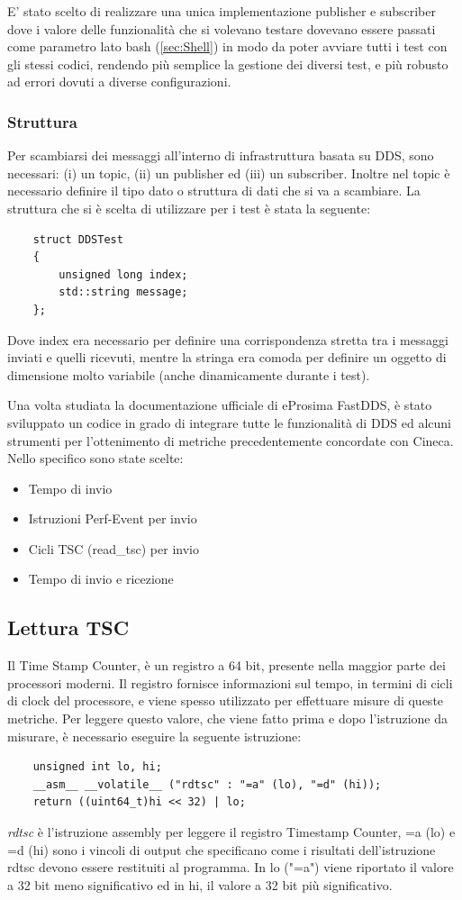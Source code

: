 E' stato scelto di realizzare una unica implementazione publisher e subscriber dove i valore delle funzionalità che si volevano testare dovevano essere passati come parametro lato bash (\ref{sec:Shell}) in modo da poter avviare tutti i test con gli stessi codici, rendendo più semplice la gestione dei diversi test, e più robusto ad errori dovuti a diverse configurazioni.
\subsubsection*{Struttura}

Per scambiarsi dei messaggi all'interno di infrastruttura basata su DDS, sono necessari: (i) un topic, (ii) un publisher ed (iii) un subscriber. Inoltre nel topic è necessario definire il tipo dato o struttura di dati che si va a scambiare. La struttura che si è scelta di utilizzare per i test è stata la seguente:
\begin{verbatim}
    struct DDSTest
    {
        unsigned long index;
        std::string message;
    };
\end{verbatim}
Dove index era necessario per definire una corrispondenza stretta tra i messaggi inviati e quelli ricevuti, mentre la stringa era comoda per definire un oggetto di dimensione molto variabile (anche dinamicamente durante i test).

Una volta studiata la documentazione ufficiale di eProsima FastDDS, è stato sviluppato un codice in grado di integrare tutte le funzionalità di DDS ed alcuni strumenti per l'ottenimento di metriche precedentemente concordate con Cineca\cite{Cineca}. Nello specifico sono state scelte:
\begin{itemize}
    \item Tempo di invio
    \item Istruzioni Perf-Event per invio
    \item Cicli TSC (read\_tsc) per invio
    \item Tempo di invio e ricezione
\end{itemize}
\subsection{Lettura TSC}
Il Time Stamp Counter, è un registro a 64 bit, presente nella maggior parte dei processori moderni. Il registro fornisce informazioni sul tempo, in termini di cicli di clock del processore, e viene spesso utilizzato per effettuare misure di queste metriche. Per leggere questo valore, che viene fatto prima e dopo l'istruzione da misurare, è necessario eseguire la seguente istruzione:
\begin{verbatim}
    unsigned int lo, hi;
    __asm__ __volatile__ ("rdtsc" : "=a" (lo), "=d" (hi));
    return ((uint64_t)hi << 32) | lo; 
\end{verbatim}
\emph{rdtsc} è l'istruzione assembly per leggere il registro Timestamp Counter, =a (lo) e =d (hi) sono i vincoli di output che specificano come i risultati dell'istruzione rdtsc devono essere restituiti al programma. In lo ("=a") viene riportato il valore a 32 bit meno significativo ed in hi, il valore a 32 bit più significativo.

